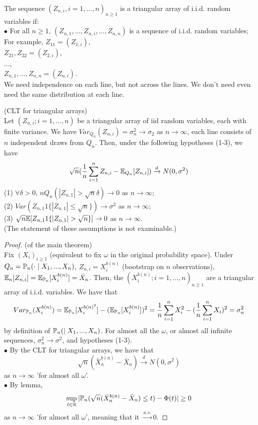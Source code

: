 \documentclass[a4paper]{article}
\begin{document}
\begin{defi}
The sequence $(Z_{n,i},i=1,...,n)_{n \geq 1}$ is a triangular array of i.i.d. random variables if:\\
$\bullet$ For all $n \geq 1$, $(Z_{n,1},...,Z_{n,i},...,Z_{n,n})$ is a sequence of i.i.d. random variables;\\
For example, $Z_{11} = (Z_{1,i})$,\\
$Z_{21},Z_{22} = (Z_{2,i})$,\\
...,\\
$Z_{n,1},...,Z_{n,n} = (Z_{n,i})$.\\
We need independence on each line, but not across the lines. We don't need even need the same distribution at each line.
\end{defi}

\begin{prop} (CLT for triangular arrays)\\
Let $(Z_{n,i};i=1,...,n)$ be a triangular array of iid random variables, each with finite variance. We have $Var_{Q_n}(Z_{n,i}) = \sigma_n^2 \to \sigma_2$ as $n \to \infty$, each line consists of $n$ independent draws from $Q_n$. Then, under the following hypotheses (1-3), we have $$\sqrt{n} (\frac{1}{n} \sum_{i=1}^n Z_{n,i} - \E_{Q_n} [Z_{n,i}])\xrightarrow{d} N(0,\sigma^2)$$
(1) $\forall \delta>0$, $n Q_n (|Z_{n,1}|>\sqrt{n}\delta) \to 0$ as $n \to \infty$;\\
(2) $Var(Z_{n,1} 1\{|Z_{n,1}|\leq \sqrt{n}\}) \to \sigma^2$ as $n \to \infty$;\\
(3) $\sqrt{n} \E [Z_{n,1} 1\{|Z_{n,1}| > \sqrt{n}\}] \to 0$ as $n \to \infty$.\\
(The statement of these assumptions is not examinable.)
\begin{proof} (of the main theorem)\\
Fix $(X_i)_{i \geq 1}$ (equivalent to fix $\omega$ in the original probability space). Under $Q_n = \P_n(\cdot \mid X_1,...,X_n)$, $Z_{n,i} = X_i^{b(n)}$ (bootstrap on $n$ observations), $\E_n[Z_{n,i}] = \E_{\P_n} [X_i^{b(n)}] = \bar{X}_n$. Then, the $(X_i^{b(n)};i=1,...,n)_{n \geq 1}$ are a triangular array of i.i.d. variables. We have that $$Var_{\P_n}(X_i^{b(n)}) = \E_{\P_n} [X_i^{b(n)^2}] - (\E_{\P_n} [X_i^{b(n)}])^2 = \frac{1}{n}\sum_{i=1}^n X_i^2-(\frac{1}{n}\sum_{i=1}^n X_i)^2 = \sigma_n^2$$ by definition of $\P_n(\mid X_1,...,X_n)$. For almost all the $\omega$, or almost all infinite sequences, $\sigma_n^2 \to \sigma^2$, and hypotheses (1-3).\\
$\bullet$ By the CLT for triangular arrays, we have that $$\sqrt{n} (\bar{X}_n^{b(n)} - \bar{X}_n) \xrightarrow{d} N(0,\sigma^2)$$ as $n \to \infty$ 'for almost all $\omega$'.\\
$\bullet$ By lemma, $$\sup_{t \in \R} | \P_n (\sqrt{n} (\bar{X}_n^{b(n)} - \bar{X}_n) \leq t) - \Phi(t)| \geq 0$$ as $n \to \infty$ 'for almost all $\omega$', meaning that it $\xrightarrow{a.s.} 0$.
\end{proof}
\end{prop}
\end{document}
